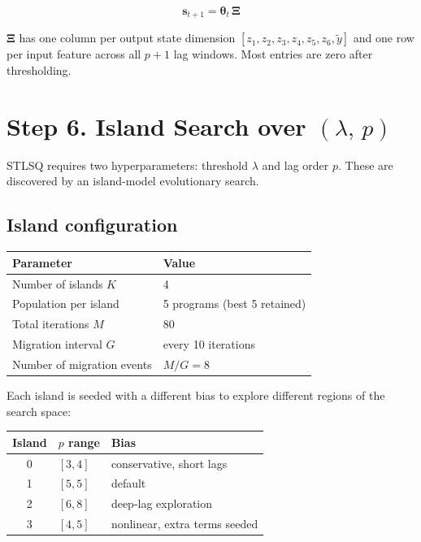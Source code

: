 \documentclass{article}
\begin{document}
\begin{equation}
    \mathbf{s}_{t+1} = \boldsymbol{\theta}_t\,\boldsymbol{\Xi}
\end{equation}

$\boldsymbol{\Xi}$ has one column per output state dimension
$[z_1, z_2, z_3, z_4, z_5, z_6, \tilde{y}]$ and one row per input feature
across all $p+1$ lag windows. Most entries are zero after thresholding.

\section*{Step 6. Island Search over $(\lambda,\, p)$}

STLSQ requires two hyperparameters: threshold $\lambda$ and lag order $p$.
These are discovered by an island-model evolutionary search.

\subsection*{Island configuration}

\begin{center}
\begin{tabular}{ll}
\toprule
Parameter & Value \\
\midrule
Number of islands $K$       & 4 \\
Population per island       & 5 programs (best 5 retained) \\
Total iterations $M$        & 80 \\
Migration interval $G$      & every 10 iterations \\
Number of migration events  & $M / G = 8$ \\
\bottomrule
\end{tabular}
\end{center}

Each island is seeded with a different bias to explore different regions of the search space:

\begin{center}
\begin{tabular}{cll}
\toprule
Island & $p$ range & Bias \\
\midrule
0 & $[3,4]$   & conservative, short lags \\
1 & $[5,5]$   & default \\
2 & $[6,8]$   & deep-lag exploration \\
3 & $[4,5]$   & nonlinear, extra terms seeded \\
\bottomrule
\end{tabular}
\end{center}
\end{document}
